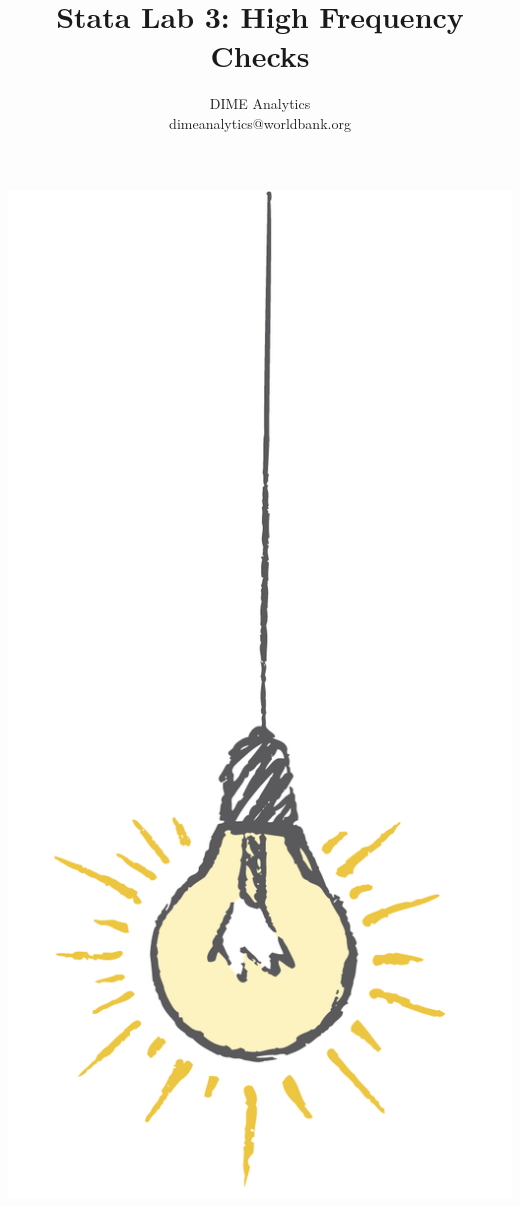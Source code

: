\documentclass{tufte-handout}
\title{Stata Lab 3: High Frequency Checks}
\author{DIME Analytics \\ dimeanalytics@worldbank.org}
\begin{document}
\maketitle%

\begin{marginfigure}%
  \includegraphics[width=\linewidth]{light.png}
\end{marginfigure}
\end{document}
